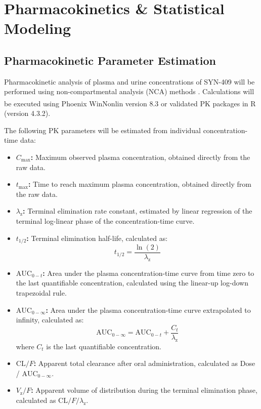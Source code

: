 \section{Pharmacokinetics \& Statistical Modeling}
\label{sec:pharmacokinetics}

\subsection{Pharmacokinetic Parameter Estimation}

Pharmacokinetic analysis of plasma and urine concentrations of SYN-409 will be performed using non-compartmental analysis (NCA) methods \citep{gibaldi2007pk}. Calculations will be executed using Phoenix WinNonlin\textsuperscript{\textregistered} version 8.3 or validated PK packages in R (version 4.3.2). 

The following PK parameters will be estimated from individual concentration-time data:
\begin{itemize}
  \item \textbf{$C_{\max}$:} Maximum observed plasma concentration, obtained directly from the raw data.
  \item \textbf{$t_{\max}$:} Time to reach maximum plasma concentration, obtained directly from the raw data.
  \item \textbf{$\lambda_{\text{z}}$:} Terminal elimination rate constant, estimated by linear regression of the terminal log-linear phase of the concentration-time curve.
  \item \textbf{$t_{1/2}$:} Terminal elimination half-life, calculated as:
    \begin{equation}
      t_{1/2} = \frac{\ln(2)}{\lambda_{\text{z}}}
    \end{equation}
  \item \textbf{$\text{AUC}_{0-t}$:} Area under the plasma concentration-time curve from time zero to the last quantifiable concentration, calculated using the linear-up log-down trapezoidal rule.
  \item \textbf{$\text{AUC}_{0-\infty}$:} Area under the plasma concentration-time curve extrapolated to infinity, calculated as:
    \begin{equation}
      \text{AUC}_{0-\infty} = \text{AUC}_{0-t} + \frac{C_t}{\lambda_{\text{z}}}
    \end{equation}
    where $C_t$ is the last quantifiable concentration.
  \item \textbf{$\text{CL}/F$:} Apparent total clearance after oral administration, calculated as Dose / $\text{AUC}_{0-\infty}$.
  \item \textbf{$V_{\text{z}}/F$:} Apparent volume of distribution during the terminal elimination phase, calculated as $\text{CL}/F / \lambda_{\text{z}}$.
\end{itemize}

